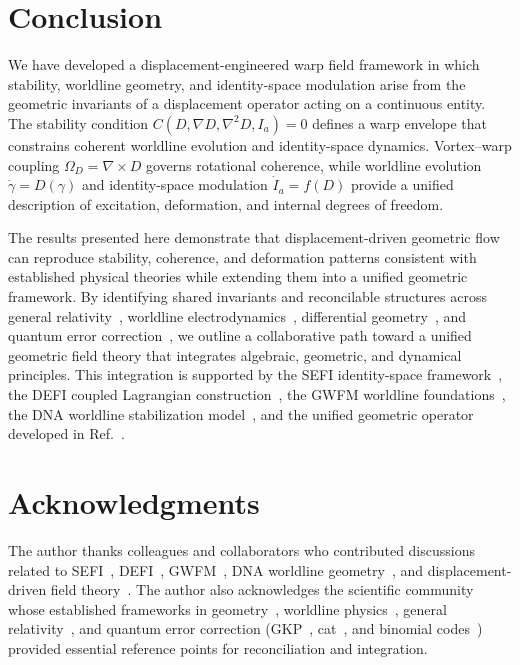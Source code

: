 \documentclass[aip,adv,reprint]{revtex4-2}
\begin{document}
\section{Conclusion}

We have developed a displacement-engineered warp field framework in which
stability, worldline geometry, and identity-space modulation arise from the
geometric invariants of a displacement operator acting on a continuous entity.
The stability condition $C(D,\nabla D,\nabla^2 D,I_a)=0$ defines a warp envelope
that constrains coherent worldline evolution and identity-space dynamics.
Vortex--warp coupling $\Omega_D=\nabla\times D$ governs rotational coherence,
while worldline evolution $\dot{\gamma}=D(\gamma)$ and identity-space modulation
$\dot{I}_a=f(D)$ provide a unified description of excitation, deformation, and
internal degrees of freedom.

The results presented here demonstrate that displacement-driven geometric flow
can reproduce stability, coherence, and deformation patterns consistent with
established physical theories while extending them into a unified geometric
framework. By identifying shared invariants and reconcilable structures across
general relativity~\cite{MTW_Gravitation_1973}, worldline electrodynamics~\cite{Wheeler_Feynman_1945,Wheeler_Feynman_1949},
differential geometry~\cite{Frenet_1851,Serret_1851}, and quantum error
correction~\cite{GKP_2001,Mirrahimi_2014,Michael_2016}, we outline a collaborative
path toward a unified geometric field theory that integrates algebraic,
geometric, and dynamical principles. This integration is supported by the SEFI
identity-space framework~\cite{Dutton_SEFI_JMP_2026}, the DEFI coupled Lagrangian
construction~\cite{Dutton_DEFI_2026}, the GWFM worldline foundations~\cite{Dutton_GWFM_JMP_2026},
the DNA worldline stabilization model~\cite{Dutton_DNA_2026}, and the unified
geometric operator developed in Ref.~\cite{Dutton_Unified_JMP_2026}.

\section{Acknowledgments}

The author thanks colleagues and collaborators who contributed discussions
related to SEFI~\cite{Dutton_SEFI_JMP_2026}, DEFI~\cite{Dutton_DEFI_2026},
GWFM~\cite{Dutton_GWFM_JMP_2026}, DNA worldline geometry~\cite{Dutton_DNA_2026},
and displacement-driven field theory~\cite{Dutton_Unified_JMP_2026}. The author
also acknowledges the scientific community whose established frameworks in
geometry~\cite{Frenet_1851,Serret_1851}, worldline physics~\cite{Wheeler_Feynman_1945,Wheeler_Feynman_1949},
general relativity~\cite{MTW_Gravitation_1973}, and quantum error correction
(GKP~\cite{GKP_2001}, cat~\cite{Mirrahimi_2014}, and binomial codes~\cite{Michael_2016})
provided essential reference points for reconciliation and integration.
\end{document}
